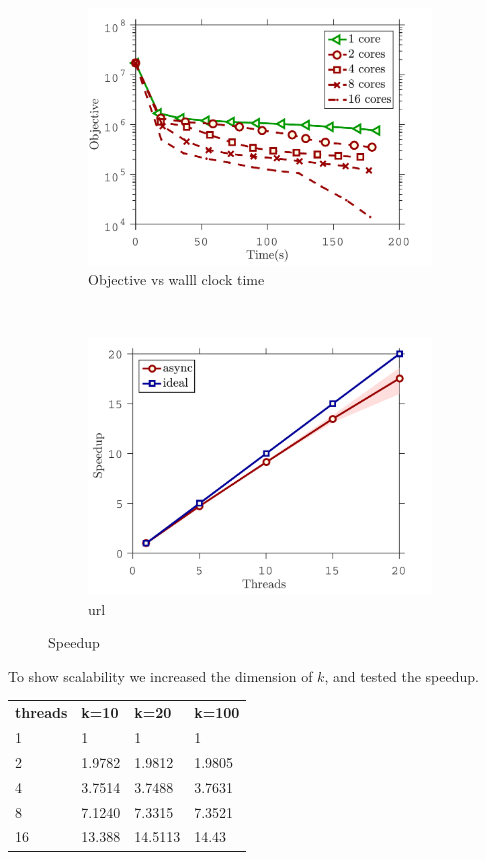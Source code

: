 \begin{figure}[!h]
        \centering
       \begin{subfigure}[b]{0.4\textwidth}
                \includegraphics[width=\textwidth]{./figs/NMF_plot}
                \caption{Objective vs walll clock time}
        \end{subfigure}
        ~~
        \begin{subfigure}[b]{0.4\textwidth}
                \includegraphics[width=\textwidth]{./figs/speedup}
                \caption{url}
        \end{subfigure} 
        \caption{Speedup}\label{fig:NMF_speedup}
\end{figure}


To show scalability we increased the dimension of $k$, and tested the speedup.

\begin{tabular}{llll}
 \toprule
\textbf{threads}&\textbf{k=10}&\textbf{k=20}&\textbf{k=100}\\\cmidrule{1-4}
1&1&1&1\\%
2&1.9782&1.9812&1.9805\\%
4&3.7514&3.7488&3.7631\\%
8&7.1240&7.3315&7.3521\\%
16&13.388&14.5113&14.43\\%
\bottomrule
\end{tabular}